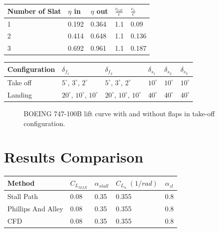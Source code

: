 \begin{center}
	\begin{tabular}{| l | l | l | l | l |}
		\hline
		 Number of Slat &  $\eta$ in &  $\eta$ out &   $\frac{c_{ext}}{c} $ & $\frac{c_{s}}{c} $   \\ \hline
				1 & 0.192  & 0.364  &1.1 & 0.09\\ \hline 
		         2 & 0.414  & 0.648  &1.1& 0.136\\ \hline 
		         3 & 0.692  & 0.961  &1.1& 0.187\\ \hline 
		\hline
	\end{tabular}
\end{center}


\begin{center}
	\begin{tabular}{ | l | l | l | l | l | l |}
		\hline
		Configuration &  $\delta_{f_1}$ & $\delta_{f_2}$ &  $\delta_{s_1}$ & $\delta_{s_2}$& $\delta_{s_3}$ \\ \hline
		Take off &  $5^{\circ}$, $3^{\circ}$, $2^{\circ}$ & $5^{\circ}$, $3^{\circ}$, $2^{\circ}$ & $10^{\circ}$ &  $10^{\circ}$ &  $10^{\circ}$\\ \hline
		Landing  &    $20^{\circ}$, $10^{\circ}$, $10^{\circ}$ & $20^{\circ}$, $10^{\circ}$, $10^{\circ}$ & $40^{\circ}$ &  $40^{\circ}$ &  $40^{\circ}$\\ \hline
		\hline
	\end{tabular}
\end{center}


\begin{figure}[H]
\centering

\caption{BOEING 747-100B  lift curve with and without flaps in take-off configuration.}
\label{fig:clATR}
\end{figure}


\section{Results Comparison}

\begin{center}
	\begin{tabular}{| l | l | l | l | l |}
		\hline
		 Method  & $C_{L_{MAX}}$ & $\alpha_{stall}$ &  $C_{L_{\alpha}} \; (1/rad)$ & $\alpha_{zl}$  \\ \hline
		 Stall Path  & 0.08  & 0.35 & 0.355 & 0.8  \\ \hline
		 Phillips And Alley  & 0.08  & 0.35 & 0.355 & 0.8\\ \hline
		 CFD  & 0.08  & 0.35 & 0.355 & 0.8   \\ \hline
		\hline
	\end{tabular}
\end{center}

	 	 
